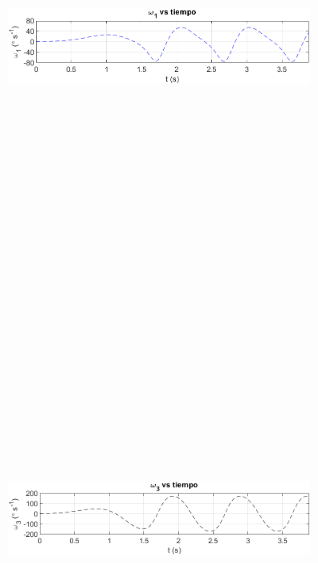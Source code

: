 \documentclass[12pt]{article}
\begin{document}
\begin{multicols}{2}
\begin{figure} [H]
    \end{figure}
        \vspace{-20pt}
        \begin{figure} [H]
        \centerline{\includegraphics[width=8cm, height=12cm,keepaspectratio]{NR Consecutivo/w1.png}}
    \end{figure}
        \vspace{-20pt}
        \begin{figure} [H]
        \centerline{\includegraphics[width=8cm, height=12cm,keepaspectratio]{NR Consecutivo/w3.png}}

\end{figure}
\end{multicols}
\end{document}
